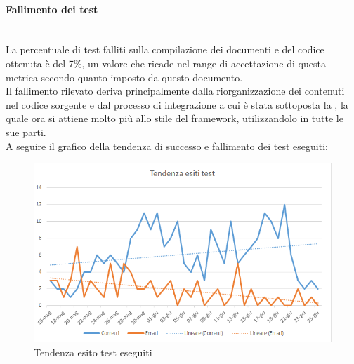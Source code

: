 \paragraph{Fallimento dei test}\mbox{}\\
La percentuale di test falliti sulla compilazione dei documenti e del codice ottenuta è del 7\%, un valore che ricade nel range di accettazione di questa metrica secondo quanto imposto da questo documento. \\
Il fallimento rilevato deriva principalmente dalla riorganizzazione dei contenuti nel codice sorgente e dal processo di integrazione a cui è stata sottoposta la \DemoName{}, la quale ora si attiene molto più allo stile del framework, utilizzandolo in tutte le sue parti.\\
A seguire il grafico della tendenza di successo e fallimento dei test eseguiti:
\begin{figure}[H]
	\centering
	\includegraphics[width=15cm]{./test.png}
	\caption{Tendenza esito test eseguiti}
\end{figure}

